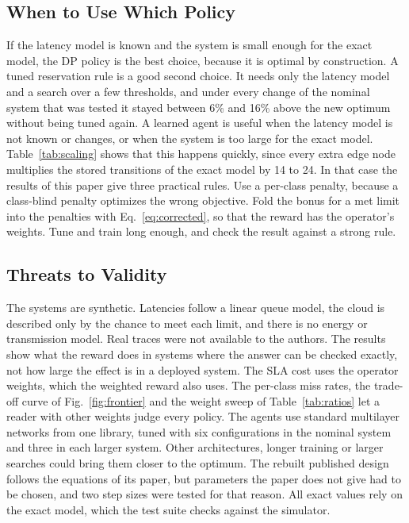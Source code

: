 \subsection{When to Use Which Policy}
If the latency model is known and the system is small enough for the exact model, the DP policy is the best choice, because it is optimal by construction. A tuned reservation rule is a good second choice. It needs only the latency model and a search over a few thresholds, and under every change of the nominal system that was tested it stayed between 6\% and 16\% above the new optimum without being tuned again. A learned agent is useful when the latency model is not known or changes, or when the system is too large for the exact model. Table~\ref{tab:scaling} shows that this happens quickly, since every extra edge node multiplies the stored transitions of the exact model by 14 to 24. In that case the results of this paper give three practical rules. Use a per-class penalty, because a class-blind penalty optimizes the wrong objective. Fold the bonus for a met limit into the penalties with Eq.~\eqref{eq:corrected}, so that the reward has the operator's weights. Tune and train long enough, and check the result against a strong rule.

\subsection{Threats to Validity}
The systems are synthetic. Latencies follow a linear queue model, the cloud is described only by the chance to meet each limit, and there is no energy or transmission model. Real traces were not available to the authors. The results show what the reward does in systems where the answer can be checked exactly, not how large the effect is in a deployed system. The SLA cost uses the operator weights, which the weighted reward also uses. The per-class miss rates, the trade-off curve of Fig.~\ref{fig:frontier} and the weight sweep of Table~\ref{tab:ratios} let a reader with other weights judge every policy. The agents use standard multilayer networks from one library, tuned with six configurations in the nominal system and three in each larger system. Other architectures, longer training or larger searches could bring them closer to the optimum. The rebuilt published design follows the equations of its paper, but parameters the paper does not give had to be chosen, and two step sizes were tested for that reason. All exact values rely on the exact model, which the test suite checks against the simulator.


